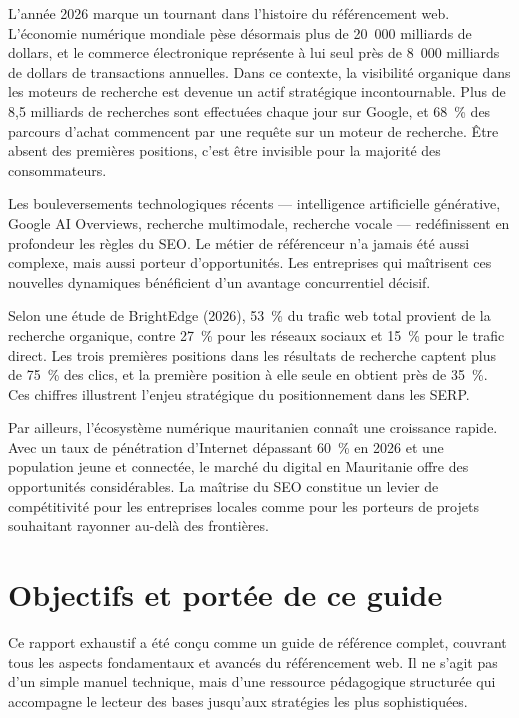 \documentclass[12pt,a4paper,twoside]{report}
\begin{document}
L'année 2026 marque un tournant dans l'histoire du référencement web. L'économie numérique mondiale pèse désormais plus de 20~000 milliards de dollars, et le commerce électronique représente à lui seul près de 8~000 milliards de dollars de transactions annuelles. Dans ce contexte, la visibilité organique dans les moteurs de recherche est devenue un actif stratégique incontournable. Plus de 8,5 milliards de recherches sont effectuées chaque jour sur Google, et 68~\% des parcours d'achat commencent par une requête sur un moteur de recherche. Être absent des premières positions, c'est être invisible pour la majorité des consommateurs.

Les bouleversements technologiques récents — intelligence artificielle générative, Google AI Overviews, recherche multimodale, recherche vocale — redéfinissent en profondeur les règles du SEO. Le métier de référenceur n'a jamais été aussi complexe, mais aussi porteur d'opportunités. Les entreprises qui maîtrisent ces nouvelles dynamiques bénéficient d'un avantage concurrentiel décisif.

Selon une étude de BrightEdge (2026), 53~\% du trafic web total provient de la recherche organique, contre 27~\% pour les réseaux sociaux et 15~\% pour le trafic direct. Les trois premières positions dans les résultats de recherche captent plus de 75~\% des clics, et la première position à elle seule en obtient près de 35~\%. Ces chiffres illustrent l'enjeu stratégique du positionnement dans les SERP.

Par ailleurs, l'écosystème numérique mauritanien connaît une croissance rapide. Avec un taux de pénétration d'Internet dépassant 60~\% en 2026 et une population jeune et connectée, le marché du digital en Mauritanie offre des opportunités considérables. La maîtrise du SEO constitue un levier de compétitivité pour les entreprises locales comme pour les porteurs de projets souhaitant rayonner au-delà des frontières.

\section*{Objectifs et portée de ce guide}

Ce rapport exhaustif a été conçu comme un guide de référence complet, couvrant tous les aspects fondamentaux et avancés du référencement web. Il ne s'agit pas d'un simple manuel technique, mais d'une ressource pédagogique structurée qui accompagne le lecteur des bases jusqu'aux stratégies les plus sophistiquées.
\end{document}
